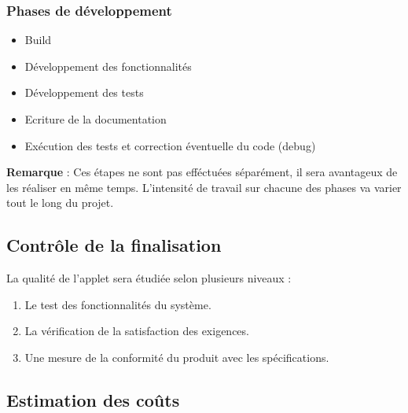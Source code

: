 			\subsubsection{Phases de développement}
				\begin{itemize}
				\item Build
				\item Développement des fonctionnalités
				\item Développement des tests
				\item Ecriture de la documentation
				\item Exécution des tests et correction éventuelle du code (debug)
				\end{itemize}
				
				\textbf{Remarque} : Ces étapes ne sont pas efféctuées séparément, il sera avantageux de les réaliser en même temps. L'intensité de travail sur chacune des phases va varier tout le long du projet.
				

		\subsection{Contrôle de la finalisation}
			La qualité de l'applet sera étudiée selon plusieurs niveaux :
			\begin{enumerate}
			\item Le test des fonctionnalités du système.
			\item La vérification de la satisfaction des exigences.
			\item Une mesure de la conformité du produit avec les spécifications.
			\end{enumerate}
			
		\subsection{Estimation des coûts}
		

